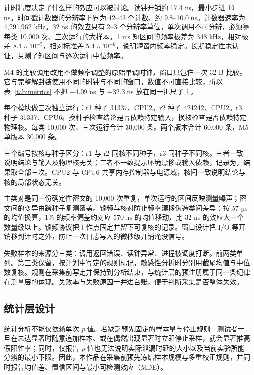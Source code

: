 计时精度决定了什么样的效应可以被讨论。读钟开销约 17.4 ns，最小步进 10 ns。时间戳计数器的分辨率下界为 42--43 个计数、约 9.8--10.0 ns。计数器速率为 4,291,962 kHz。32 ns 的效应只有 2--3 个分辨率单位，单次调用不可分辨，必须靠每类 10,000 次、三次运行的大样本。1 ms 短区间的频率极差为 348 kHz，相对极差 $8.1\times10^{-5}$，相对标准差 $5.4\times10^{-6}$，说明短窗内频率稳定。长期稳定性未认证，只测了短区间与逐次运行中位频率。 %

M4 的比较调用改用不做频率调整的原始单调时钟，窗口只包住一次 32 B 比较。它与完整解封装使用不同的时钟与不同的窗口，数值不可直接比较，所以表~\ref{tab:metrics} 不把 $-4.09$ ns 与 $+32.3$ ns 放在同一把尺子上。

每个模块做三次独立运行：r1 种子 31337、CPU2。r2 种子 424242、CPU2。r3 种子 31337、CPU6。换种子检查结论是否依赖特定输入，换核检查是否依赖特定物理核。每类 10,000 次、三次运行合计 30,000 条。两个版本合计 60,000 条，M5 单版本 30,000 条。 %

三个编号按核与种子区分：r1 与 r2 同核不同种子，r3 同种子不同核。三者一致说明结论与输入及物理核无关；三者不一致提示环境漂移或输入依赖，记录为，结果取全部三次。CPU2 与 CPU6 共享内存控制器与电源域，核间一致说明结论与核的局部状态无关。

主类对是同一份确定性密文的 10,000 次重复，单次运行的区间反映测量噪声；密文间的变异由跨种子复测覆盖。锁频与核对防止频率漂移伪造类间差异：按 57 µs 的均值换算，1\% 的频率偏差约对应 570 ns 的均值移动，比 32 ns 的效应大一个数量级以上。锁频协议把工作点固定并留下可复核的记录。窗口设计把 I/O 等开销移到计时之外，防止一次日志写入的微秒级开销淹没信号。

失败样本的来源分三类：调用返回错误、读钟异常、进程被调度打断。前两类单列。第三类保留，按计划中写定的规则标记，敏感性分析时分别用截尾均值与中位数复核。规则在采集前写定并保持到分析结束，与统计层的预注册属于同一条纪律在测量层的体现。失败率与失败原因一并进台账，便于判断采集是否整体失效。

\subsection{统计层设计}

统计分析不能仅依赖单次 $p$ 值。若缺乏预先固定的样本量与停止规则，测试者一旦在未达显著时随意追加样本、或在偶然出现显著时立即停止采样，就会显著推高假阳性率；同时，仅报告 $p$ 值也无法说明实际泄漏时延的大小以及当前实验所能分辨的最小下限。因此，本作品在采集前预先冻结样本规模与多重校正规则，并同时报告均值差、置信区间与最小可检测效应（MDE）。

